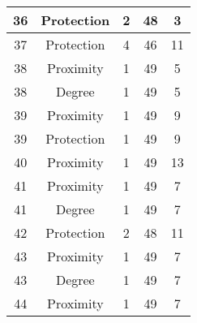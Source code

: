 \documentclass[results.tex]{subfiles}
\begin{document}
\begin{center}
\begin{tabular}{| c || c | c | c | c |}
            \hline
            36                      & Protection                   & 2                      & 48                      & 3                    \\
            \hline
            37                      & Protection                   & 4                      & 46                      & 11                   \\
            \hline
            38                      & Proximity                    & 1                      & 49                      & 5                    \\
            \hline
            38                      & Degree                       & 1                      & 49                      & 5                    \\
            \hline
            39                      & Proximity                    & 1                      & 49                      & 9                    \\
            \hline
            39                      & Protection                   & 1                      & 49                      & 9                    \\
            \hline
            40                      & Proximity                    & 1                      & 49                      & 13                   \\
            \hline
            41                      & Proximity                    & 1                      & 49                      & 7                    \\
            \hline
            41                      & Degree                       & 1                      & 49                      & 7                    \\
            \hline
            42                      & Protection                   & 2                      & 48                      & 11                   \\
            \hline
            43                      & Proximity                    & 1                      & 49                      & 7                    \\
            \hline
            43                      & Degree                       & 1                      & 49                      & 7                    \\
            \hline
            44                      & Proximity                    & 1                      & 49                      & 7                    \\

\end{tabular}
\end{center}
\end{document}
